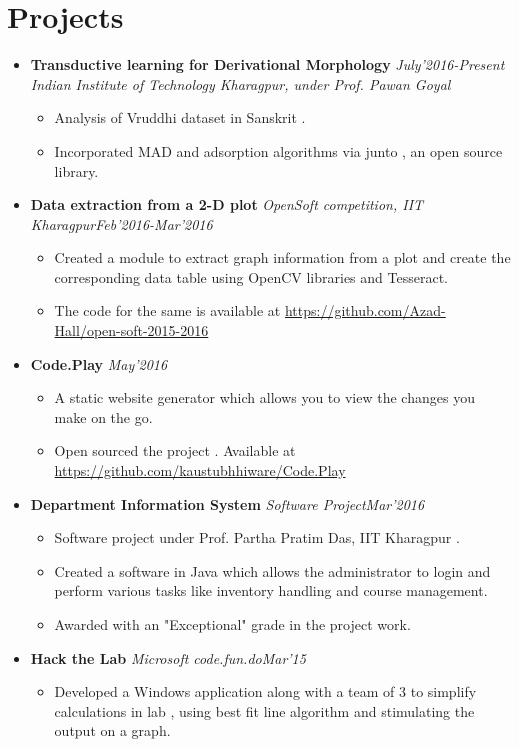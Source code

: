 \documentclass[11pt,a4paper]{moderncv}
\newcommand{\experience}[4]{
  \vspace{0.1cm}
\item \textbf{\large{#1}} \textit{#2}\hfill\textit{#3}
  \begin{itemize}[leftmargin=*]
    \setlength\itemsep{0em} #4
  \end{itemize}
}
\newcommand{\experiencetwo}[4]{
  \vspace{0.1cm}
\item \textbf{\large{#1}} \hfill\textit{#3}\\\textit{#2}
  \begin{itemize}[leftmargin=*]
    \setlength\itemsep{0em} #4
  \end{itemize}
}
\begin{document}
\section*{Projects}
\begin{itemize}
  \setlength\itemsep{0.5em}

  \experiencetwo{Transductive learning for Derivational Morphology}{Indian Institute of Technology Kharagpur, under Prof. Pawan Goyal}{July'2016-Present}{
   \item Analysis of Vruddhi dataset in Sanskrit .
   \item Incorporated MAD and adsorption algorithms via junto , an open source library.
  }

  \experience{Data extraction from a 2-D plot}{OpenSoft competition, IIT Kharagpur}{Feb'2016-Mar'2016}{
  \item Created a module to extract graph information from a plot and create the corresponding data table using OpenCV libraries and Tesseract.
  \item The code for the same is available at \url{https://github.com/Azad-Hall/open-soft-2015-2016}
  }
  
  \experiencetwo{Code.Play}{}{May'2016}{
  \item A static website generator which allows you to view the changes you make on the go.
  \item Open sourced the project . Available at \url{https://github.com/kaustubhhiware/Code.Play}
  }

  \experience{Department Information System}{Software Project}{Mar'2016}{
  \item Software project under Prof. Partha Pratim Das, IIT Kharagpur .
  \item Created a software in Java which allows the administrator to login and perform various tasks like inventory handling and course management.
  \item Awarded with an "Exceptional" grade in the project work.
  }

  \experience{Hack the Lab}{Microsoft code.fun.do}{Mar'15}{
  \item   Developed a Windows application along  with a team of 3 to simplify calculations in lab , using best fit line algorithm and stimulating the output on a graph.
  }

\end{itemize}
\end{document}
